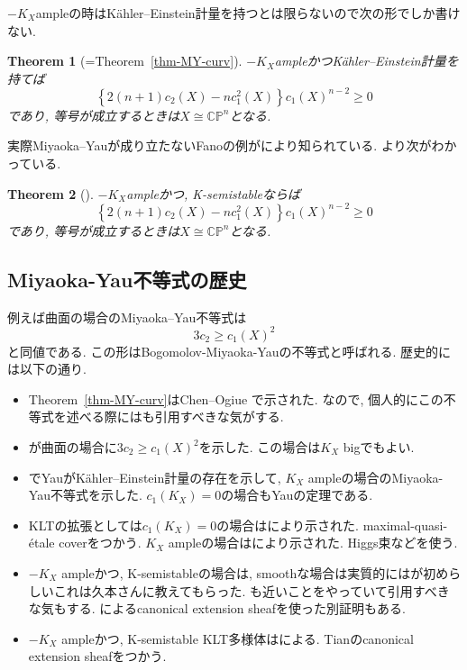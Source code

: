 \documentclass[dvipdfmx,a4paper,11pt]{article} %
\newtheorem{thm}{Theorem}[section]
\theoremstyle{definition}
\theoremstyle{remark}
\numberwithin{equation}{section}
\begin{document}
$-K_X$ampleの時はK\"ahler--Einstein計量を持つとは限らないので次の形でしか書けない. 
\begin{thm}[{=Theorem~\ref{thm-MY-curv}}]
$-K_X$ampleかつK\"ahler--Einstein計量を持てば
\[
\left\{
2(n+1)c_2(X)-nc_{1}^{2}(X)
\right\}c_1(X)^{n-2}
\geq 0
\]
であり, 等号が成立するときは$X \cong \mathbb{C}\mathbb{P}^n$となる.
\end{thm}

実際Miyaoka--Yauが成り立たないFanoの例が\cite{GKP22}により知られている. 
\cite{Bando, SW16, GKP22, DGP24}より次がわかっている. 

\begin{thm}[{\cite{Bando, SW16, GKP22, DGP24}}]
$-K_X$ampleかつ, K-semistableならば
\[
\left\{
2(n+1)c_2(X)-nc_{1}^{2}(X)
\right\}c_1(X)^{n-2}
\geq 0
\]
であり, 等号が成立するときは$X \cong \mathbb{C}\mathbb{P}^n$となる.
\end{thm}


\subsection{Miyaoka-Yau不等式の歴史}
  
  例えば曲面の場合のMiyaoka--Yau不等式は
\[
3c_2 \geq c_1(X)^2
\]
と同値である. この形はBogomolov-Miyaoka-Yauの不等式と呼ばれる.
歴史的には以下の通り.
\begin{itemize}
\item Theorem~\ref{thm-MY-curv}はChen--Ogiue \cite{CO75}で示された. なので, 個人的にこの不等式を述べる際には\cite{CO75}も引用すべきな気がする. 
\item \cite{Miy77}が曲面の場合に$3c_2 \geq c_1(X)^2$を示した. この場合は$K_X$ bigでもよい. 
\item \cite{Yau77}でYauがK\"ahler--Einstein計量の存在を示して, $K_X$ ampleの場合のMiyaoka-Yau不等式を示した. $c_1(K_X)=0$の場合もYauの定理である. 
\item KLTの拡張としては$c_1(K_X)=0$の場合は\cite{GKP16, LT18}により示された. maximal-quasi-\'etale coverをつかう. $K_X$ ampleの場合は\cite{GKPT19a, GKPT19b}により示された. Higgs束などを使う.
\item $-K_X$ ampleかつ, K-semistableの場合は, smoothな場合は実質的には\cite{Bando}が初めらしいこれは久本さんに教えてもらった. \cite{SW16}も近いことをやっていて引用すべきな気もする. \cite{Tian92}によるcanonical extension sheafを使った別証明もある. 
\item $-K_X$ ampleかつ, K-semistable KLT多様体は\cite{GKP22, DGP24}による. Tianのcanonical extension sheafをつかう. 
\end{itemize}
\end{document}

